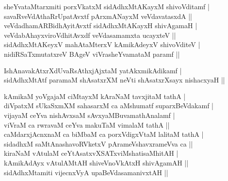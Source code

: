 \begin{entry}
\smallskip
\begin{shl}
sheYvataMtarxmiti porxVkatxM sidAdhxMtAKayxM shivoVditamf |\\[1pt]
savaRveVdAthaRrUpatAvxtf pArxmANayxM veVdavatasxdA ||\\[1pt]
veVdadhamARBidhAyitAvxtf sidAdhxMtAKayxH shivAgamaH |\\[1pt]
veVdabAhayxviroVdhitAvxdf veVdasamamxta ucayxteV ||\\[1pt]
sidAdhxMtAKeyxV mahAtaMterxV kAmikAdeyxV shivoVditeV |\\[1pt]
nidiRSaTxmutatxreV BAgeV viVrasheYvamataM paramf ||
\end{shl}
\smallskip
{}
\smallskip
{}
\smallskip
{}
\smallskip
\begin{shl}
IshAnavakAtxrXdUvaRsAthxjAjxtaM yatAkxmikAdikamf |\\[1pt]
sidAdhxMtAtf paramaM shAsatxrXM neVti shAsatxrXsayx nishacxyaH ||
\end{shl}
\smallskip
{}
\smallskip
\begin{shl}
kAmikaM yoVgajaM ciMtayxM kAraNaM tavxjitaM tathA |\\[1pt]
diVpatxM sUkaSxmXM sahasarxM ca aMshumatf suparxBeVdakamf |\\[1pt]
vijayaM ceYva nishAvxsaM sAvxyaMBuvamathAnalamf |\\[1pt]
viVraM ca rwravaM ceYva makuTaM vimalaM tathA ||\\[1pt]
caMdarxjAcnxnaM ca biMbaM ca porxVdigxVtaM lalitaM tathA |\\[1pt]
sidadhxM saMtAnashavoRVketxV pArameVshavxrameVva ca ||\\[1pt]
kiraNaM vAtulaM ceYtAsatxvXSATxviMshatisaMhitAH |\\[1pt]
kAmikAdAyx vAtulAMtAH shiveVnoVkAtxH shivAgamAH ||\\[1pt]
sidAdhxMtamiti vijecnxVyA upaBeVdasamanivxtAH ||
\end{shl}
\medskip
{}
\smallskip
{}
\end{entry}
